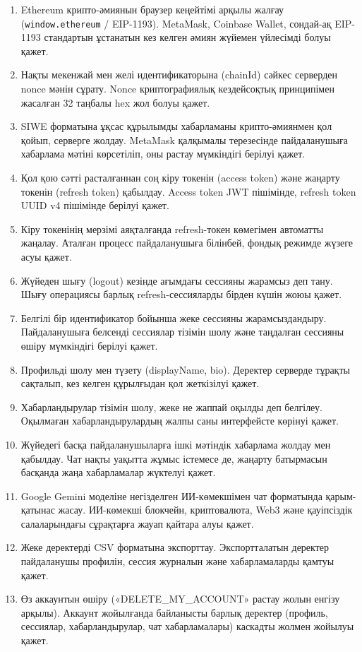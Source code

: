 \documentclass[14pt,a4paper]{extarticle}
\begin{document}
\begin{enumerate}[nosep]
\item Ethereum крипто-әмиянын браузер кеңейтімі арқылы жалғау (\texttt{window.ethereum} / EIP-1193). MetaMask, Coinbase Wallet, сондай-ақ EIP-1193 стандартын ұстанатын кез келген әмиян жүйемен үйлесімді болуы қажет.
\item Нақты мекенжай мен желі идентификаторына (chainId) сәйкес серверден nonce мәнін сұрату. Nonce криптографиялық кездейсоқтық принципімен жасалған 32 таңбалы hex жол болуы қажет.
\item SIWE форматына ұқсас құрылымды хабарламаны крипто-әмиянмен қол қойып, серверге жолдау. MetaMask қалқымалы терезесінде пайдаланушыға хабарлама мәтіні көрсетіліп, оны растау мүмкіндігі берілуі қажет.
\item Қол қою сәтті расталғаннан соң кіру токенін (access token) және жаңарту токенін (refresh token) қабылдау. Access token JWT пішімінде, refresh token UUID v4 пішімінде берілуі қажет.
\item Кіру токенінің мерзімі аяқталғанда refresh-токен көмегімен автоматты жаңалау. Аталған процесс пайдаланушыға білінбей, фондық режимде жүзеге асуы қажет.
\item Жүйеден шығу (logout) кезінде ағымдағы сессияны жарамсыз деп тану. Шығу операциясы барлық refresh-сессияларды бірден күшін жоюы қажет.
\item Белгілі бір идентификатор бойынша жеке сессияны жарамсыздандыру. Пайдаланушыға белсенді сессиялар тізімін шолу және таңдалған сессияны өшіру мүмкіндігі берілуі қажет.
\item Профильді шолу мен түзету (displayName, bio). Деректер серверде тұрақты сақталып, кез келген құрылғыдан қол жеткізілуі қажет.
\item Хабарландырулар тізімін шолу, жеке не жаппай оқылды деп белгілеу. Оқылмаған хабарландырулардың жалпы саны интерфейсте көрінуі қажет.
\item Жүйедегі басқа пайдаланушыларға ішкі мәтіндік хабарлама жолдау мен қабылдау. Чат нақты уақытта жұмыс істемесе де, жаңарту батырмасын басқанда жаңа хабарламалар жүктелуі қажет.
\item Google Gemini моделіне негізделген ИИ-көмекшімен чат форматында қарым-қатынас жасау. ИИ-көмекші блокчейн, криптовалюта, Web3 және қауіпсіздік салаларындағы сұрақтарға жауап қайтара алуы қажет.
\item Жеке деректерді CSV форматына экспорттау. Экспортталатын деректер пайдаланушы профилін, сессия журналын және хабарламаларды қамтуы қажет.
\item Өз аккаунтын өшіру («DELETE\_MY\_ACCOUNT» растау жолын енгізу арқылы). Аккаунт жойылғанда байланысты барлық деректер (профиль, сессиялар, хабарландырулар, чат хабарламалары) каскадты жолмен жойылуы қажет.
\end{enumerate}
\end{document}
